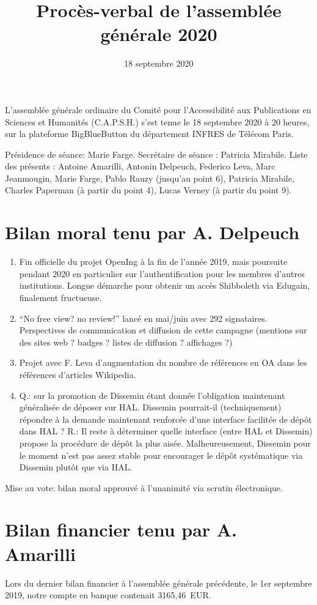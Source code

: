 \documentclass[a4paper]{article}
\title{Procès-verbal de l'assemblée générale 2020}
\date{18 septembre 2020}
\begin{document}
\maketitle

L'assemblée générale ordinaire du Comité pour l'Accessibilité aux Publications en Sciences et Humanités (C.A.P.S.H.) s'est tenue le 18 septembre 2020 à 20 heures, sur la plateforme BigBlueButton du département INFRES de Télécom Paris. 

Présidence de séance: Marie Farge.
Secrétaire de séance : Patricia Mirabile.
Liste des présents : Antoine Amarilli, Antonin Delpeuch, Federico Leva, Marc Jeanmougin, Marie Farge, Pablo Rauzy (jusqu'au point 6), Patricia Mirabile, Charles Paperman (à partir du point 4), Lucas Verney (à partir du point 9).
    
\section{Bilan moral tenu par A. Delpeuch}

\begin{enumerate}
\item Fin officielle du projet OpenIng à la fin de l'année 2019, mais poursuite pendant 2020 en particulier sur l'authentification pour les membres d'autres institutions. Longue démarche pour obtenir un accès Shibboleth via Edugain, finalement fructueuse. 
\item ``No free view? no review!'' lancé en mai/juin avec 292 signataires. Perspectives de communication et diffusion de cette campagne (mentions sur des sites web ? badges ? listes de diffusion ? affichages ?)
\item Projet avec F. Leva d'augmentation du nombre de références en OA dans les références d'articles Wikipedia. 
\item Q.: sur la promotion de Dissemin étant donnée l'obligation maintenant généralisée de déposer sur HAL. Dissemin pourrait-il (techniquement) répondre à la demande maintenant renforcée d'une interface facilitée de dépôt dans HAL ? R.: Il reste à déterminer quelle interface (entre HAL et Dissemin) propose la procédure de dépôt la plus aisée. Malheureusement, Dissemin pour le moment n'est pas assez stable pour encourager le dépôt systématique via Dissemin plutôt que via HAL. 
\end{enumerate}
  
Mise au vote: bilan moral approuvé à l'unanimité via scrutin électronique.

\section{Bilan financier tenu par A. Amarilli}
Lors du dernier bilan financier à l'assemblée générale précédente, le 1er septembre 2019, notre compte en banque contenait 3165,46~EUR.
\end{document}
